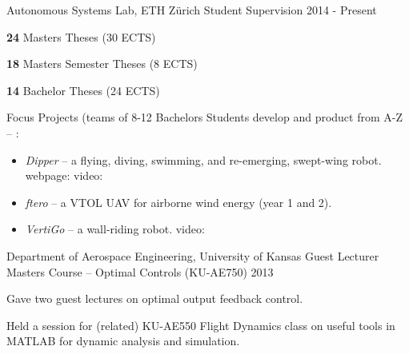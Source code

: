 \begin{cventries}
\cvteachentry
  	{Autonomous Systems Lab, ETH Z\"{u}rich} %
  	{Student Supervision} %
    {} %
    {2014 - Present} %
    {
      \begin{cvitems} %
        \item \textbf{24} Masters Theses (30 ECTS)
		\item \textbf{18} Masters Semester Theses (8 ECTS)
		\item \textbf{14} Bachelor Theses (24 ECTS)
		\item Focus Projects (teams of 8-12 Bachelors Students develop and product from A-Z -- :
		\begin{itemize}[label=-]
			\item \emph{Dipper} -- a flying, diving, swimming, and re-emerging, swept-wing robot.\\ webpage:  video: 
			\item \emph{ftero} -- a VTOL UAV for airborne wind energy (year 1 and 2). 
			\item \emph{VertiGo} -- a wall-riding robot. video: 	
		\end{itemize}
      \end{cvitems}
    } %
    {} %
    {\showprojectdescriptions}
    
\cvteachentry
  	{Department of Aerospace Engineering, University of Kansas} %
  	{Guest Lecturer} %
    {Masters Course -- Optimal Controls (KU-AE750)} %
    {2013} %
    {
      \begin{cvitems} %
        \item Gave two guest lectures on optimal output feedback control. %
		\item Held a session for (related) KU-AE550 Flight Dynamics class on useful tools in MATLAB for dynamic analysis and simulation.
      \end{cvitems}
    } %
    {} %
    {\showteachingdescriptions}


\end{cventries}
